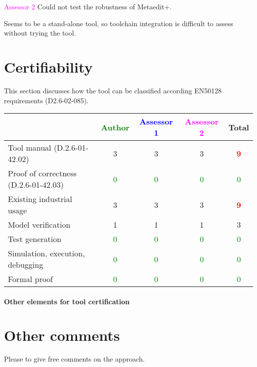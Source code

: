 \textcolor{magenta}{Assessor 2} Could not test the robustness of Metaedit+.

Seems to be a stand-alone tool, so toolchain integration is difficult to assess
without trying the tool.

\section{Certifiability}

This section discusses how the tool can be classified according EN50128 requirements (D2.6-02-085).


\begin{tabular}{|l | c | c | c | c|}
\hline
& \textcolor{green}{Author} & \textcolor{blue}{Assessor 1} & \textcolor{magenta}{Assessor 2} & Total \\
\hline 
Tool manual (D.2.6-01-42.02) &3 &3 & 3   & \textcolor{red}{\textbf{9}} \\
\hline
Proof of correctness (D.2.6-01-42.03)   & \textcolor{green}{0}   & \textcolor{green}{0}   & \textcolor{green}{0} & \textcolor{green}{0} \\
\hline
Existing industrial  usage  &3 &3 & 3   & \textcolor{red}{\textbf{9}} \\
\hline
Model verification &1 &1 & 1   & 3    \\
\hline
Test generation & \textcolor{green}{0}   & \textcolor{green}{0}   & \textcolor{green}{0} & \textcolor{green}{0} \\
\hline
Simulation, execution, debugging & \textcolor{green}{0}   & \textcolor{green}{0}   & \textcolor{green}{0} & \textcolor{green}{0} \\
\hline
Formal proof & \textcolor{green}{0}   & \textcolor{green}{0}   & \textcolor{green}{0} & \textcolor{green}{0} \\
\hline
\end{tabular}

\paragraph{Other elements for tool certification}

\section{Other comments}
Please to  give free comments on the approach.




